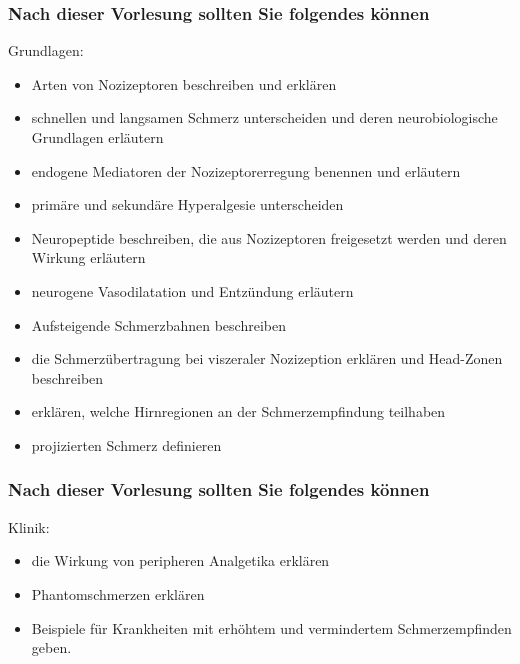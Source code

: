 \documentclass{beamer}
\begin{document}
\begin{frame}


 \frametitle{Nach dieser Vorlesung sollten Sie folgendes können}



\begin{block}{Grundlagen:}




\begin{itemize}

    \item 
    
Arten von Nozizeptoren beschreiben und erklären
    \item 
 schnellen und langsamen Schmerz unterscheiden und deren neurobiologische Grundlagen erläutern
    \item 
 endogene Mediatoren der Nozizeptorerregung benennen und erläutern
    \item 
 primäre und sekundäre Hyperalgesie unterscheiden
    \item 
 Neuropeptide beschreiben, die aus Nozizeptoren freigesetzt werden und deren Wirkung erläutern
    \item 
 neurogene Vasodilatation und Entzündung erläutern
    \item 
 Aufsteigende Schmerzbahnen beschreiben
    \item 
 die Schmerzübertragung bei viszeraler Nozizeption erklären und Head-Zonen beschreiben
    \item 
erklären, welche  Hirnregionen an der Schmerzempfindung teilhaben
    \item 
 projizierten Schmerz definieren

\end{itemize}


\end{block}

\end{frame}


\begin{frame}


 \frametitle{Nach dieser Vorlesung sollten Sie folgendes können}
 

\begin{block}{Klinik:}

\begin{itemize}
    
\item 
die Wirkung von peripheren Analgetika erklären
    \item 
 Phantomschmerzen erklären
    \item 
 Beispiele für Krankheiten mit erhöhtem und vermindertem Schmerzempfinden geben. 

\end{itemize}


\end{block}



\end{frame}
\end{document}

